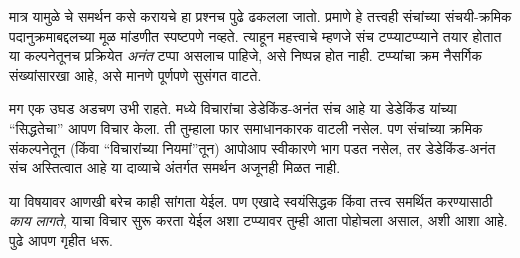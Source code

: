 \documentclass[../../../include/open-logic-section]{subfiles}
\begin{document}
मात्र यामुळे \stagesinf{} चे समर्थन कसे करायचे हा प्रश्नच पुढे ढकलला जातो. \stagessucc{} प्रमाणे हे तत्त्वही संचांच्या संचयी-क्रमिक पदानुक्रमाबद्दलच्या मूळ मांडणीत स्पष्टपणे नव्हते. त्याहून महत्त्वाचे म्हणजे संच टप्प्याटप्प्याने तयार होतात या कल्पनेतूनच प्रक्रियेत \emph{अनंत} टप्पा असलाच पाहिजे, असे निष्पन्न होत नाही. टप्प्यांचा क्रम नैसर्गिक संख्यांसारखा आहे, असे मानणे पूर्णपणे सुसंगत वाटते.

मग एक उघड अडचण उभी राहते.  मध्ये विचारांचा डेडेकिंड-अनंत संच आहे या डेडेकिंड यांच्या ``सिद्धतेचा'' आपण विचार केला. ती तुम्हाला फार समाधानकारक वाटली नसेल. पण संचांच्या क्रमिक संकल्पनेतून (किंवा ``विचारांच्या नियमां''तून) \stagesinf{} आपोआप स्वीकारणे भाग पडत नसेल, तर डेडेकिंड-अनंत संच अस्तित्वात आहे या दाव्याचे अंतर्गत समर्थन अजूनही मिळत नाही.

या विषयावर आणखी बरेच काही सांगता येईल. पण एखादे स्वयंसिद्धक किंवा तत्त्व समर्थित करण्यासाठी \emph{काय लागते}, याचा विचार सुरू करता येईल अशा टप्प्यावर तुम्ही आता पोहोचला असाल, अशी आशा आहे. पुढे आपण \stagesinf{} गृहीत धरू.
\end{document}
